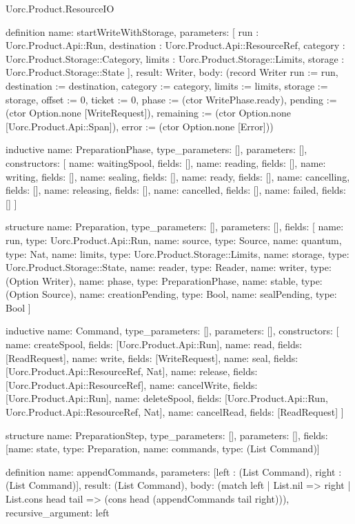 \begin{lexlean}{Uorc.Product.ResourceIO}
\begin{semanticmodule}
definition{
  name: startWriteWithStorage,
  parameters: [
    run : Uorc.Product.Api::Run,
    destination : Uorc.Product.Api::ResourceRef,
    category : Uorc.Product.Storage::Category,
    limits : Uorc.Product.Storage::Limits,
    storage : Uorc.Product.Storage::State
  ],
  result: Writer,
  body: (record Writer {run := run, destination := destination, category := category, limits := limits, storage := storage, offset := 0, ticket := 0, phase := (ctor WritePhase.ready), pending := (ctor Option.none [WriteRequest]), remaining := (ctor Option.none [Uorc.Product.Api::Span]), error := (ctor Option.none [Error])})
}

inductive{
  name: PreparationPhase,
  type_parameters: [],
  parameters: [],
  constructors: [
    {name: waitingSpool, fields: []},
    {name: reading, fields: []},
    {name: writing, fields: []},
    {name: sealing, fields: []},
    {name: ready, fields: []},
    {name: cancelling, fields: []},
    {name: releasing, fields: []},
    {name: cancelled, fields: []},
    {name: failed, fields: []}
  ]
}

structure{
  name: Preparation,
  type_parameters: [],
  parameters: [],
  fields: [
    {name: run, type: Uorc.Product.Api::Run},
    {name: source, type: Source},
    {name: quantum, type: Nat},
    {name: limits, type: Uorc.Product.Storage::Limits},
    {name: storage, type: Uorc.Product.Storage::State},
    {name: reader, type: Reader},
    {name: writer, type: (Option Writer)},
    {name: phase, type: PreparationPhase},
    {name: stable, type: (Option Source)},
    {name: creationPending, type: Bool},
    {name: sealPending, type: Bool}
  ]
}

inductive{
  name: Command,
  type_parameters: [],
  parameters: [],
  constructors: [
    {name: createSpool, fields: [Uorc.Product.Api::Run]},
    {name: read, fields: [ReadRequest]},
    {name: write, fields: [WriteRequest]},
    {name: seal, fields: [Uorc.Product.Api::ResourceRef, Nat]},
    {name: release, fields: [Uorc.Product.Api::ResourceRef]},
    {name: cancelWrite, fields: [Uorc.Product.Api::Run]},
    {name: deleteSpool, fields: [Uorc.Product.Api::Run, Uorc.Product.Api::ResourceRef, Nat]},
    {name: cancelRead, fields: [ReadRequest]}
  ]
}

structure{
  name: PreparationStep,
  type_parameters: [],
  parameters: [],
  fields: [{name: state, type: Preparation}, {name: commands, type: (List Command)}]
}

definition{
  name: appendCommands,
  parameters: [left : (List Command), right : (List Command)],
  result: (List Command),
  body: (match left
    | List.nil => right
    | List.cons head tail => (cons head (appendCommands tail right))),
  recursive_argument: left
}


\end{semanticmodule}
\end{lexlean}
